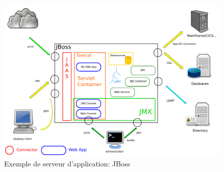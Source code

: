 {  \begin{figure}[hb]
    \begin{center}
      \includegraphics[scale=0.4]{img/integration-product.png}
      \caption{Exemple de serveur d'application: JBoss}
      \label{integration-product}
    \end{center}
  \end{figure}
}

